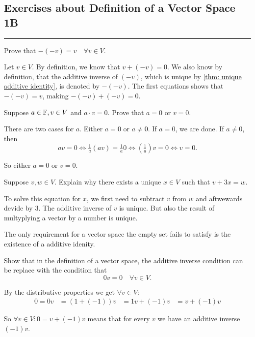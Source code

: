 \subsection*{Exercises about Definition of a Vector Space 1B}
\hrule
\phantom{.}

\begin{xrcs}
  Prove that $-(-v) = v \quad \forall v \in V$.

  \begin{xprf}
    Let $v \in V$. By definition, we know that $v + (-v) = 0$. We also know by definition, that the additive inverse of $(-v)$, which is unique by \ref{thm: unique additive identity}, is denoted by $-(-v)$. The first equations shows that $-(-v) = v$, making $-(-v) + (-v) = 0$.
  \end{xprf}
\end{xrcs}

\begin{xrcs}
  Suppose $a \in \mathbb{F}, v \in V$ and $a \cdot v = 0$. Prove that $a=0$ or $v=0$.

  \begin{xprf}
    There are two cases for $a$. Either $a=0$ or $a\neq 0$. If $a=0$, we are done. If $a \neq 0$, then
    \[
    av=0 \iff \tfrac{1}{a}(av)=\tfrac{1}{a}0 \iff \left(\tfrac{1}{a} \right)v = 0 \iff v = 0.
    \]

    So either $a=0$ or $v=0$.
  \end{xprf}
\end{xrcs}


\begin{xrcs}
  Suppose $v,w \in V$. Explain why there exists a unique $x \in V$ such that $v + 3x = w$.

   To solve this equation for $x$, we first need to subtract $v$ from $w$ and aftwewards devide by $3$. The additive inverse of $v$ is unique. But also the result of multyplying a vector by a number is unique.
\end{xrcs}

\begin{xrcs}
   The only requirement for a vector space the empty set fails to satisfy is the existence of a additive idenity.
\end{xrcs}

\begin{xrcs}
  Show that in the definition of a vector space, the additive inverse condition can be replace with the condition that
  \[
    0v = 0 \quad \forall v \in V.
  \]

  \begin{xprf}
    By the distributive properties we get $\forall v \in V:$
    \[
    \begin{aligned}
      0 = 0v &= (1 + (-1))v
      &= 1v + (-1)v
      &= v + (-1)v
    \end{aligned}
    \]

    So $\forall v \in V: 0= v + (-1)v$ means that for every $v$ we have an additive inverse $(-1)v$.
  \end{xprf}
\end{xrcs}
